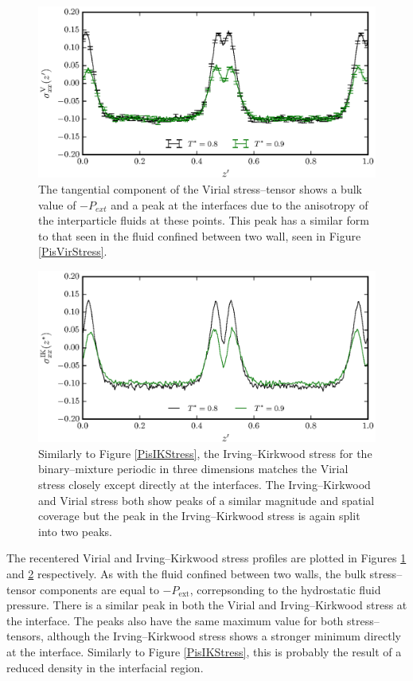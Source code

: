 \begin{figure}[h]
\centering
\includegraphics[scale=0.8]{Period10VirStress}
\caption{The tangential component of the Virial stress--tensor shows a bulk value of $-P_{ext}$ and a peak at the interfaces due to the anisotropy of the interparticle fluids at these points.
This peak has a similar form to that seen in the fluid confined between two wall, seen in Figure \ref{PisVirStress}.
}
\label{Period10VirStress}
\end{figure}

\begin{figure}[h]
\centering
\includegraphics[scale=0.8]{Period10IKStress}
\caption{Similarly to Figure \ref{PisIKStress}, the Irving--Kirkwood stress for the binary--mixture periodic in three dimensions matches the Virial stress closely except directly at the interfaces.
The Irving--Kirkwood and Virial stress both show peaks of a similar magnitude and spatial coverage but the peak in the Irving--Kirkwood stress is again split into two peaks.
}
\label{Period10IKStress}
\end{figure}
The recentered Virial and Irving--Kirkwood stress profiles are plotted in Figures \ref{Period10VirStress} and \ref{Period10IKStress} respectively.
As with the fluid confined between two walls, the bulk stress--tensor components are equal to $-P_{\mathrm{ext}}$, correpsonding to the hydrostatic fluid pressure.
There is a similar peak in both the Virial and Irving--Kirkwood stress at the interface.
The peaks also have the same maximum value for both stress--tensors, although the Irving--Kirkwood stress shows a stronger minimum directly at the interface.
Similarly to Figure \ref{PisIKStress}, this is probably the result of a reduced density in the interfacial region.

